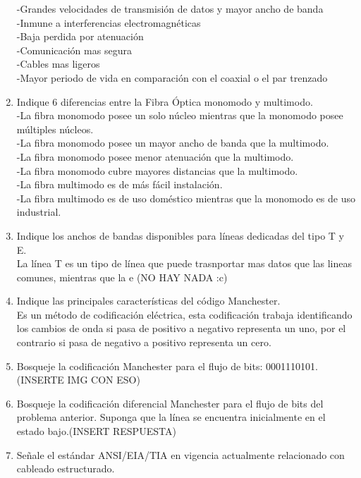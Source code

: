 \documentclass{udparticle}
\begin{document}
\begin{enumerate}
-Grandes velocidades de transmisión de datos y mayor ancho de banda\\
-Inmune a interferencias electromagnéticas\\
-Baja perdida por atenuación\\
-Comunicación mas segura\\
-Cables mas ligeros\\
-Mayor periodo de vida en comparación con el coaxial o el par trenzado\\
\item  Indique 6 diferencias entre la Fibra Óptica monomodo y multimodo.\\
-La fibra monomodo posee un solo núcleo mientras que la monomodo posee múltiples núcleos.\\
-La fibra monomodo posee un mayor ancho de banda que la multimodo.\\
-La fibra monomodo posee menor atenuación que la multimodo.\\
-La fibra monomodo cubre mayores distancias que la multimodo.\\
-La fibra multimodo es de más fácil instalación.\\
-La fibra multimodo es de uso doméstico mientras que la monomodo es de uso industrial.\\
\item Indique los anchos de bandas disponibles para líneas dedicadas del tipo T y E.\\
La línea T es un tipo de línea que puede trasnportar mas datos que las lineas comunes, mientras que la e (NO HAY NADA :c)\\
\item  Indique las principales características del código Manchester.\\
Es un método de codificación eléctrica, esta codificación trabaja identificando los cambios de onda si pasa de positivo a negativo representa un uno, por el contrario si pasa de negativo a positivo representa un cero.\\
\item Bosqueje la codificación Manchester para el ﬂujo de bits: 0001110101.(INSERTE IMG CON ESO)\\
\item  Bosqueje la codificación diferencial Manchester para el ﬂujo de bits del problema anterior. Suponga que la línea se encuentra inicialmente en el estado bajo.(INSERT RESPUESTA)\\
\item Señale el estándar ANSI/EIA/TIA en vigencia actualmente relacionado con cableado estructurado.\\

\end{enumerate}
\end{document}
